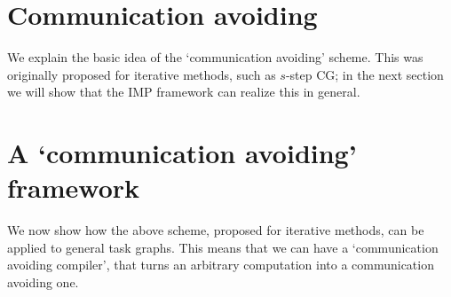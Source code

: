 \documentclass[11pt,fleqn]{article}
\begin{document}
\section{Communication avoiding}

We explain the basic idea of the `communication avoiding' scheme. This
was originally proposed for iterative methods, such as $s$-step CG; in
the next section we will show that the IMP framework can realize this
in general.



\section{A `communication avoiding' framework}

We now show how the above scheme, proposed for iterative methods, can
be applied to general task graphs. This means that we can have a
`communication avoiding compiler', that turns an arbitrary computation
into a communication avoiding one.



\end{document}
